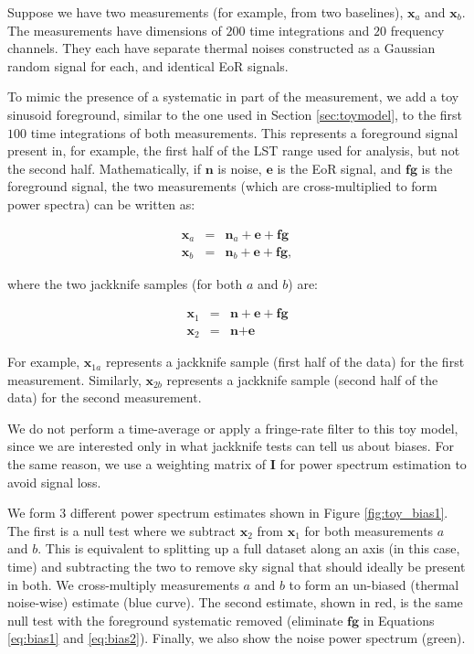 \documentclass[preprint2,numberedappendix,tighten]{aastex6}  %
\begin{document}
Suppose we have two measurements (for example, from two baselines), $\textbf{x}_{a}$ and $\textbf{x}_{b}$. The measurements have dimensions of $200$ time integrations and $20$ frequency channels. They each have separate thermal noises constructed as a Gaussian random signal for each, and identical EoR signals. 

To mimic the presence of a systematic in part of the measurement, we add a toy sinusoid foreground, similar to the one used in Section \ref{sec:toymodel}, to the first $100$ time integrations of both measurements. This represents a foreground signal present in, for example, the first half of the LST range used for analysis, but not the second half. Mathematically, if  $\textbf{n}$ is noise, $\textbf{e}$ is the EoR signal, and $\textbf{fg}$ is the foreground signal, the two measurements (which are cross-multiplied to form power spectra) can be written as:

\begin{eqnarray}
\label{eq:bias1}
\textbf{x}_{a} &=& \textbf{n}_{a} + \textbf{e} + \textbf{fg} \\
\label{eq:bias2}
\textbf{x}_{b} &=& \textbf{n}_{b} + \textbf{e} + \textbf{fg},
\end{eqnarray}

\noindent where the two jackknife samples (for both $a$ and $b$) are:

\begin{eqnarray}
\textbf{x}_{1} &=& \textbf{n} + \textbf{e} + \textbf{fg} \\
\textbf{x}_{2} &=& \textbf{n} + \textbf{e} 
\end{eqnarray}

\noindent For example, $\textbf{x}_{1a}$ represents a jackknife sample (first half of the data) for the first measurement. Similarly, $\textbf{x}_{2b}$ represents a jackknife sample (second half of the data) for the second measurement.

We do not perform a time-average or apply a fringe-rate filter to this toy model, since we are interested only in what jackknife tests can tell us about biases. For the same reason, we use a weighting matrix of $\textbf{I}$ for power spectrum estimation to avoid signal loss. 

We form $3$ different power spectrum estimates shown in Figure \ref{fig:toy_bias1}. The first is a null test where we subtract $\textbf{x}_{2}$ from $\textbf{x}_{1}$ for both measurements $a$ and $b$. This is equivalent to splitting up a full dataset along an axis (in this case, time) and subtracting the two to remove sky signal that should ideally be present in both. We cross-multiply measurements $a$ and $b$ to form an un-biased (thermal noise-wise) estimate (blue curve). The second estimate, shown in red, is the same null test with the foreground systematic removed (eliminate $\textbf{fg}$ in Equations \ref{eq:bias1} and \ref{eq:bias2}). Finally, we also show the noise power spectrum (green).
\end{document}
